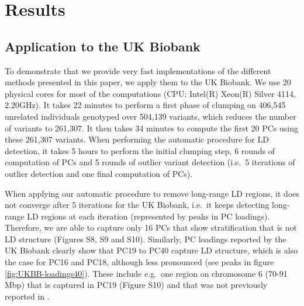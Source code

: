 \documentclass{bioinfo}
\begin{document}

\section{Results}

\subsection{Application to the UK Biobank}

To demonstrate that we provide very fast implementations of the different methods presented in this paper, we apply them to the UK Biobank. We use 20 physical cores for most of the computations (CPU: Intel(R) Xeon(R) Silver 4114, 2.20GHz).
It takes 22 minutes to perform a first phase of clumping on 406,545 unrelated individuals genotyped over 504,139 variants, which reduces the number of variants to 261,307. It then takes 34 minutes to compute the first 20 PCs using these 261,307 variants.
When performing the automatic procedure for LD detection, it takes 5 hours to perform the initial clumping step, 6 rounds of computation of PCs and 5 rounds of outlier variant detection (i.e.\ 5 iterations of outlier detection and one final computation of PCs).

When applying our automatic procedure to remove long-range LD regions, it does not converge after 5 iterations for the UK Biobank, i.e.\ it keeps detecting long-range LD regions at each iteration (represented by peaks in PC loadings).
Therefore, we are able to capture only 16 PCs that show stratification that is not LD structure (Figures S8, S9 and S10).
Similarly, PC loadings reported by the UK Biobank clearly show that PC19 to PC40 capture LD structure, which is also the case for PC16 and PC18, although less pronounced (see peaks in figure \ref{fig:UKBB-loadings40}). 
These include e.g.\ one region on chromosome 6 (70-91 Mbp) that is captured in PC19 (Figure S10) and that was not previously reported in \cite{price2008long}.
\end{document}

